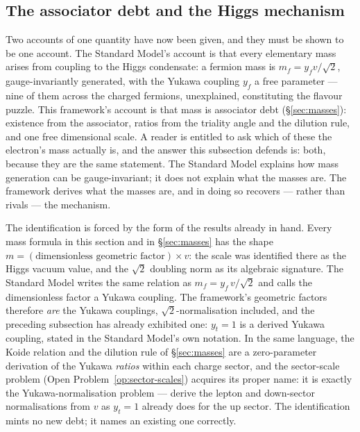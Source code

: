 \subsection{The associator debt and the Higgs mechanism}
\label{sec:associator-higgs}

Two accounts of one quantity have now been given, and they must be shown to be one account. The
Standard Model's account is that every elementary mass arises from coupling to the Higgs condensate:
a fermion mass is $m_f = y_f v/\sqrt2$, gauge-invariantly generated, with the Yukawa coupling $y_f$
a free parameter --- nine of them across the charged fermions, unexplained, constituting the flavour
puzzle. This framework's account is that mass is associator debt (\S\ref{sec:masses}): existence from
the associator, ratios from the triality angle and the dilution rule, and one free dimensional scale.
A reader is entitled to ask which of these the electron's mass actually is, and the answer this
subsection defends is: both, because they are the same statement. The Standard Model explains how
mass generation can be gauge-invariant; it does not explain what the masses are. The framework
derives what the masses are, and in doing so recovers --- rather than rivals --- the mechanism.

The identification is forced by the form of the results already in hand. Every mass formula in this
section and in \S\ref{sec:masses} has the shape $m = (\text{dimensionless geometric factor}) \times
v$: the scale was identified there as the Higgs vacuum value, and the $\sqrt2$ doubling norm as its
algebraic signature. The Standard Model writes the same relation as $m_f = y_f\,v/\sqrt2$ and calls
the dimensionless factor a Yukawa coupling. The framework's geometric factors therefore \emph{are}
the Yukawa couplings, $\sqrt2$-normalisation included, and the preceding subsection has already
exhibited one: $y_t = 1$ is a derived Yukawa coupling, stated in the Standard Model's own notation.
In the same language, the Koide relation and the dilution rule of \S\ref{sec:masses} are a
zero-parameter derivation of the Yukawa \emph{ratios} within each charge sector, and the sector-scale
problem (Open Problem~\ref{op:sector-scales}) acquires its proper name: it is exactly the
Yukawa-normalisation problem --- derive the lepton and down-sector normalisations from $v$ as
$y_t = 1$ already does for the up sector. The identification mints no new debt; it names an existing
one correctly.

